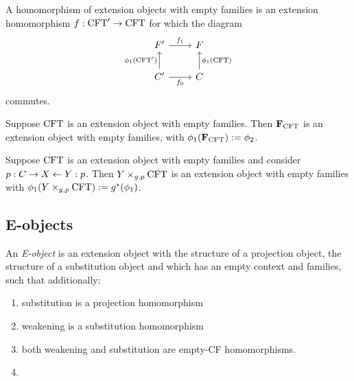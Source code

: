 \begin{defn}
A homomorphism of extension objects with empty families is an extension
homomorphism $f:\mathrm{CFT}'\to\mathrm{CFT}$ for which the diagram
\begin{equation*}
\begin{tikzcd}
\stesysf'
  \ar{r}{f_1}
  &
\stesysf
  \\
\stesysc'
  \ar{u}{\phi_1(\stesys')}
  \ar{r}[swap]{f_0}
  &
\stesysc
  \ar{u}[swap]{\phi_1(\stesys)}
\end{tikzcd}
\end{equation*}
commutes.
\end{defn}

\begin{lem}
Suppose $\mathrm{CFT}$ is an extension object with empty families. Then
$\mathbf{F}_{\mathrm{CFT}}$ is an extension object with empty families, with
$\phi_1(\mathbf{F}_{\mathrm{CFT}}):=\phi_2$. 
\end{lem}

\begin{lem}
Suppose $\mathrm{CFT}$ is an extension object with empty families and consider
$p:C\rightarrow X\leftarrow Y:p$. Then
$\cobesys{Y}{\stesys}{g}{p}$ is an extension object with empty families
with $\phi_1(\cobesys{Y}{\stesys}{g}{p}):=g^\ast(\phi_1)$.
\end{lem}

\subsection{E-objects}
\begin{defn}
An \emph{E-object} is an extension object with the structure of a projection object,
the structure of a substitution object and which has an empty context and families,
such that additionally:
\begin{enumerate}
\item substitution is a projection homomorphism
\item weakening is a substitution homomorphism
\item both weakening and substitution are empty-CF homomorphisms.
\item 
\end{enumerate}
\end{defn}

